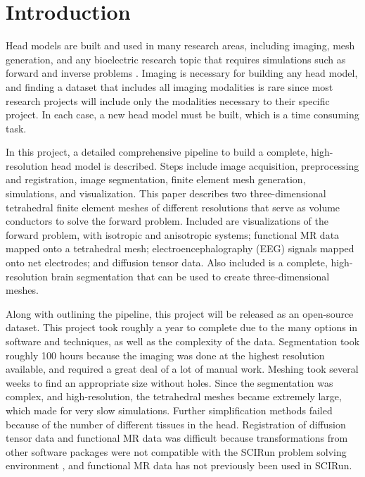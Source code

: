 
\section{Introduction}
\label{sec:intro}

Head models are built and used in many research areas, including imaging, mesh generation, and any bioelectric research topic that requires simulations such as forward and inverse problems \cite{ref:Brette2012}. Imaging is necessary for building any head model, and finding a dataset that includes all imaging modalities is rare since most research projects will include only the modalities necessary to their specific project. In each case, a new head model must be built, which is a time consuming task.

In this project, a detailed comprehensive pipeline to build a complete, high-resolution head model is described. Steps include image acquisition, preprocessing and registration, image segmentation, finite element mesh generation, simulations, and visualization. This paper describes two three-dimensional tetrahedral finite element meshes of different resolutions that serve as volume conductors to solve the forward problem. Included are visualizations of the forward problem, with isotropic and anisotropic systems; functional MR data mapped onto a tetrahedral mesh; electroencephalography (EEG) signals mapped onto net electrodes; and diffusion tensor data. Also included is a complete, high-resolution brain segmentation that can be used to create three-dimensional meshes. 

Along with outlining the pipeline, this project will be released as an open-source dataset. This project took roughly a year to complete due to the many options in software and techniques, as well as the complexity of the data. Segmentation took roughly 100 hours because the imaging was done at the highest resolution available, and required a great deal of a lot of manual work. Meshing took several weeks to find an appropriate size without holes. Since the segmentation was complex, and high-resolution, the tetrahedral meshes became extremely large, which made for very slow simulations. Further simplification methods failed because of the number of different tissues in the head. Registration of diffusion tensor data and functional MR data was difficult because transformations from other software packages were not compatible with the SCIRun problem solving environment \cite{ref:scirun}, and functional MR data has not previously been used in SCIRun.